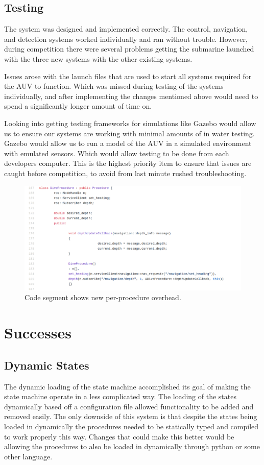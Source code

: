 \subsection{Testing}
The system was designed and implemented correctly. The control, navigation, and
detection systems worked individually and ran without trouble. However, during
competition there were several problems getting the submarine launched with the
three new systems with the other existing systems.

Issues arose with the launch files that are used to start all systems required
for the AUV to function. Which was missed during testing of the systems
individually, and after implementing the changes mentioned above would need to
spend a significantly longer amount of time on.

Looking into getting testing frameworks for simulations like Gazebo would allow
us to ensure our systems are working with minimal amounts of in water testing.
Gazebo would allow us to run a model of the AUV in a simulated environment with
emulated sensors.
Which would allow testing to be done from each developers computer.
This is the highest priority item to ensure that issues are caught before
competition, to avoid from last minute rushed troubleshooting.

\begin{figure}
\centering
\includegraphics[width=150mm]{Figures/NewProcedureOverhead}
\decoRule
\caption[New Procedure Overhead]{Code segment shows new per-procedure overhead.}
\label{fig:NewProcedureOverhead}
\end{figure}

\section{Successes}

\subsection{Dynamic States}
The dynamic loading of the state machine accomplished its goal of making the
state machine operate in a less complicated way.
The loading of the states dynamically based off a configuration file allowed
functionality to be added and removed easily.
The only downside of this system is that despite the states being loaded in
dynamically the procedures needed to be statically typed and compiled to work
properly this way.
Changes that could make this better would be allowing the procedures to also be
loaded in dynamically through python or some other language.

